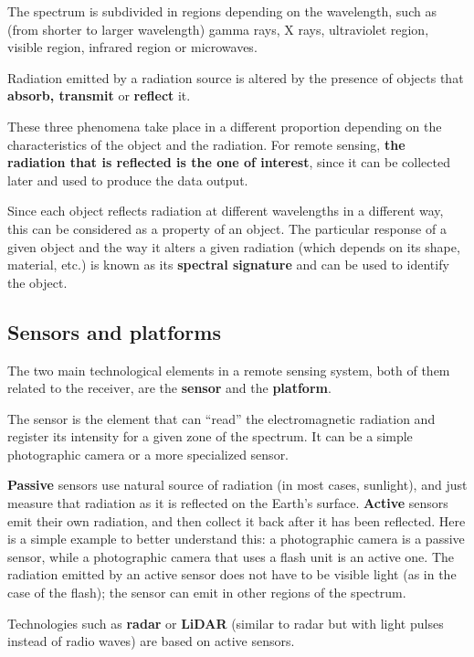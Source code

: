 The spectrum is subdivided in regions depending on the wavelength, such as (from shorter to larger wavelength) gamma rays, X rays, ultraviolet region, visible region, infrared region or microwaves.


Radiation emitted by a radiation source is altered by the presence of objects that \textbf{absorb, transmit} or \textbf{reflect} it.

These three phenomena take place in a different proportion depending on the characteristics of the object and the radiation. For remote sensing, \textbf{the radiation that is reflected is the one of interest}, since it can be collected later and used to produce the data output.

Since each object reflects radiation at different wavelengths in a different way, this can be considered as a property of an object. The particular response of a given object and the way it alters a given radiation (which depends on its shape, material, etc.) is known as its \textbf{spectral signature} and can be used to identify the object.


\subsection{Sensors and platforms}

The two main technological elements in a remote sensing system, both of them related to the receiver, are the \textbf{sensor} and the \textbf{platform}.

The sensor is the element that can ``read'' the electromagnetic radiation and register its intensity for a given zone of the spectrum. It can be a simple photographic camera or a more specialized sensor.

\textbf{Passive} sensors use natural source of radiation (in most cases, sunlight), and just measure that radiation as it is reflected on the Earth's surface. \textbf{Active} sensors emit their own radiation, and then collect it back after it has been reflected. Here is a simple example to better understand this: a photographic camera is a passive sensor, while a photographic camera that uses a flash unit is an active one. The radiation emitted by an active sensor does not have to be visible light (as in the case of the flash); the sensor can emit in other regions of the spectrum.

Technologies such as \textbf{radar} or \textbf{LiDAR} (similar to radar but with light pulses instead of radio waves) are based on active sensors.

